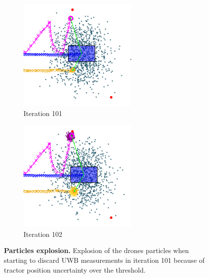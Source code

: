 \documentclass[letterpaper,twocolumn,10pt]{article}
\begin{document}
\begin{figure}[p]
     \centering
     \begin{subfigure}[b]{0.23\textwidth}
         \centering
         \includegraphics[width=\textwidth]{images/no_GNS_high_noise_101_touse.png}
         \caption{Iteration 101}
         \label{fig:5a}
     \end{subfigure}
     \hfill
     \begin{subfigure}[b]{0.23\textwidth}
         \centering
         \includegraphics[width=\textwidth]{images/no_GNS_high_noise_102_touse.png}
         \caption{Iteration 102}
         \label{fig:5b}
     \end{subfigure}
     \caption{\textbf{Particles explosion.} Explosion of the drones particles when starting to discard UWB measurements in iteration 101 because of tractor position uncertainty over the threshold. }
     \label{fig:5}
\end{figure}
\end{document}

